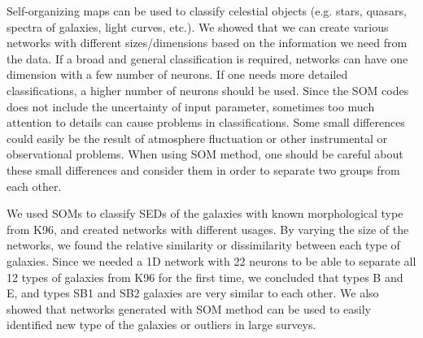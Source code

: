 \documentclass[useAMS,usenatbib]{mn2e}
\begin{document}

Self-organizing maps can be used to classify celestial objects (e.g. stars, quasars, spectra of galaxies, light curves, etc.).
We showed that we can create various networks with different sizes/dimensions based on the information we need from the data. 
If a broad and general classification is required, networks can have one dimension with a few number of neurons.
If one needs more detailed classifications, a higher number of neurons should be used.
Since the SOM codes does not include the uncertainty of input parameter, sometimes too much attention to details can cause problems in classifications. 
Some small differences could easily be the result of atmosphere fluctuation or other instrumental or observational problems. 
When using SOM method, one should be careful about these small differences and consider them in order to separate two groups from each other.

We used SOMs to classify SEDs of the galaxies with known morphological type from K96, and created networks with different usages.
By varying the size of the networks, we found the relative similarity or dissimilarity between each type of galaxies.
Since we needed a 1D network with 22 neurons to be able to separate all 12 types of galaxies from K96 for the first time, we concluded that types B and E, and types SB1 and SB2 galaxies are very similar to each other.
We also showed that networks generated with SOM method can be used to easily identified new type of the galaxies or outliers in large surveys.
\end{document}
